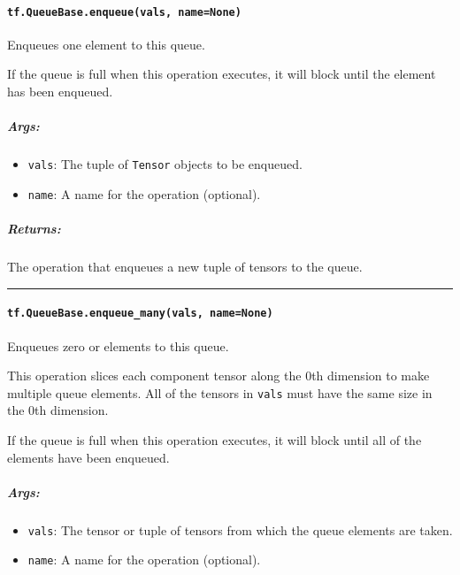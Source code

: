 \paragraph{\texorpdfstring{\texttt{tf.QueueBase.enqueue(vals,\ name=None)}
}{tf.QueueBase.enqueue(vals, name=None) }}\label{tf.queuebase.enqueuevals-namenone}

Enqueues one element to this queue.

If the queue is full when this operation executes, it will block until
the element has been enqueued.

\subparagraph{Args: }\label{args-47}

\begin{itemize}
\tightlist
\item
  \texttt{vals}: The tuple of \texttt{Tensor} objects to be enqueued.
\item
  \texttt{name}: A name for the operation (optional).
\end{itemize}

\subparagraph{Returns: }\label{returns-41}

The operation that enqueues a new tuple of tensors to the queue.

\begin{center}\rule{0.5\linewidth}{\linethickness}\end{center}

\paragraph{\texorpdfstring{\texttt{tf.QueueBase.enqueue\_many(vals,\ name=None)}
}{tf.QueueBase.enqueue\_many(vals, name=None) }}\label{tf.queuebase.enqueueux5fmanyvals-namenone}

Enqueues zero or elements to this queue.

This operation slices each component tensor along the 0th dimension to
make multiple queue elements. All of the tensors in \texttt{vals} must
have the same size in the 0th dimension.

If the queue is full when this operation executes, it will block until
all of the elements have been enqueued.

\subparagraph{Args: }\label{args-48}

\begin{itemize}
\tightlist
\item
  \texttt{vals}: The tensor or tuple of tensors from which the queue
  elements are taken.
\item
  \texttt{name}: A name for the operation (optional).
\end{itemize}


